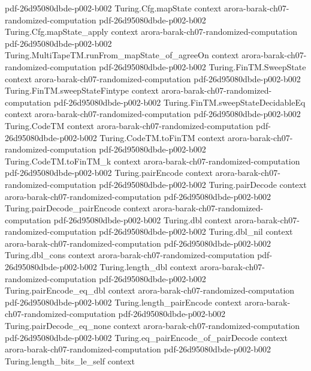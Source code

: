 \begin{theorem}
  {pdf-26d95080dbde-p002-b002}
\proofstep
  {Turing.Cfg.mapState}
  {context}
  {arora-barak-ch07-randomized-computation}
  {pdf-26d95080dbde-p002-b002}
\proofstep
  {Turing.Cfg.mapState_apply}
  {context}
  {arora-barak-ch07-randomized-computation}
  {pdf-26d95080dbde-p002-b002}
\proofstep
  {Turing.MultiTapeTM.runFrom_mapState_of_agreeOn}
  {context}
  {arora-barak-ch07-randomized-computation}
  {pdf-26d95080dbde-p002-b002}
\proofstep
  {Turing.FinTM.SweepState}
  {context}
  {arora-barak-ch07-randomized-computation}
  {pdf-26d95080dbde-p002-b002}
\proofstep
  {Turing.FinTM.sweepStateFintype}
  {context}
  {arora-barak-ch07-randomized-computation}
  {pdf-26d95080dbde-p002-b002}
\proofstep
  {Turing.FinTM.sweepStateDecidableEq}
  {context}
  {arora-barak-ch07-randomized-computation}
  {pdf-26d95080dbde-p002-b002}
\proofstep
  {Turing.CodeTM}
  {context}
  {arora-barak-ch07-randomized-computation}
  {pdf-26d95080dbde-p002-b002}
\proofstep
  {Turing.CodeTM.toFinTM}
  {context}
  {arora-barak-ch07-randomized-computation}
  {pdf-26d95080dbde-p002-b002}
\proofstep
  {Turing.CodeTM.toFinTM_k}
  {context}
  {arora-barak-ch07-randomized-computation}
  {pdf-26d95080dbde-p002-b002}
\proofstep
  {Turing.pairEncode}
  {context}
  {arora-barak-ch07-randomized-computation}
  {pdf-26d95080dbde-p002-b002}
\proofstep
  {Turing.pairDecode}
  {context}
  {arora-barak-ch07-randomized-computation}
  {pdf-26d95080dbde-p002-b002}
\proofstep
  {Turing.pairDecode_pairEncode}
  {context}
  {arora-barak-ch07-randomized-computation}
  {pdf-26d95080dbde-p002-b002}
\proofstep
  {Turing.dbl}
  {context}
  {arora-barak-ch07-randomized-computation}
  {pdf-26d95080dbde-p002-b002}
\proofstep
  {Turing.dbl_nil}
  {context}
  {arora-barak-ch07-randomized-computation}
  {pdf-26d95080dbde-p002-b002}
\proofstep
  {Turing.dbl_cons}
  {context}
  {arora-barak-ch07-randomized-computation}
  {pdf-26d95080dbde-p002-b002}
\proofstep
  {Turing.length_dbl}
  {context}
  {arora-barak-ch07-randomized-computation}
  {pdf-26d95080dbde-p002-b002}
\proofstep
  {Turing.pairEncode_eq_dbl}
  {context}
  {arora-barak-ch07-randomized-computation}
  {pdf-26d95080dbde-p002-b002}
\proofstep
  {Turing.length_pairEncode}
  {context}
  {arora-barak-ch07-randomized-computation}
  {pdf-26d95080dbde-p002-b002}
\proofstep
  {Turing.pairDecode_eq_none}
  {context}
  {arora-barak-ch07-randomized-computation}
  {pdf-26d95080dbde-p002-b002}
\proofstep
  {Turing.eq_pairEncode_of_pairDecode}
  {context}
  {arora-barak-ch07-randomized-computation}
  {pdf-26d95080dbde-p002-b002}
\proofstep
  {Turing.length_bits_le_self}
  {context}

\end{theorem}
